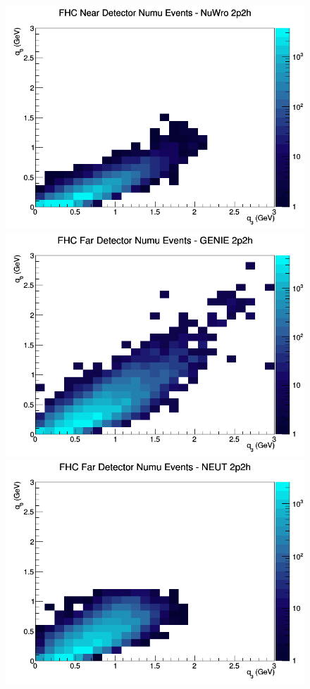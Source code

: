 \begin{figure}[h]
\includegraphics[width=\linewidth]{eff_q0_q3/GAr/2p2h_FHC_ND_numu_q3_q0_NuWro.png}
\endminipage
\newline
{}
\includegraphics[width=\linewidth]{eff_q0_q3/GAr/2p2h_FHC_FD_numu_q3_q0_GENIE.png}
\endminipage
{}
\includegraphics[width=\linewidth]{eff_q0_q3/GAr/2p2h_FHC_FD_numu_q3_q0_NEUT.png}

\end{figure}
